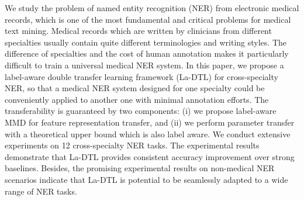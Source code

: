 We study the problem of named entity recognition (NER) from electronic medical records, which is one of the most fundamental and critical problems for medical text mining. Medical records which are written by clinicians from different specialties usually contain quite different terminologies and writing styles. The difference of specialties and the cost of human annotation makes it particularly difficult to train a universal medical NER system. In this paper, we propose a label-aware double transfer learning framework (La-DTL) for cross-specialty NER, so that a medical NER system designed for one specialty could be conveniently applied to another one with minimal annotation efforts. The transferability is guaranteed by two components: (i) we propose label-aware MMD for feature representation transfer, and (ii) we perform parameter transfer with a theoretical upper bound which is also label aware. We conduct extensive experiments on 12 cross-specialty NER tasks. The experimental results demonstrate that La-DTL provides consistent accuracy improvement over strong baselines. Besides, the promising experimental results on non-medical NER scenarios indicate that La-DTL is potential to be seamlessly adapted to a wide range of NER tasks.
